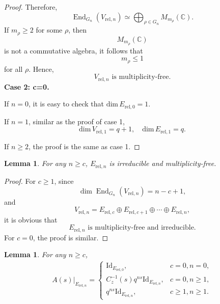 \documentclass[11pt]{amsart}
\newtheorem {lemma}      [theorem]    {Lemma}
\renewcommand{\rm}{\mathrm}
\theoremstyle{definition}
\numberwithin{equation}{section}
\begin{document}
\begin{proof}
		Therefore,
		\[
		\operatorname{End}_{G_n}(V_{\rm{rel},n}) \simeq \bigoplus_{\rho \in \widehat{G_n}} M_{m_\rho}(\mathbb{C}).
		\]
		If \(m_\rho \geq 2\) for some \(\rho\), then
		\[
		M_{m_\rho}(\mathbb{C})
		\]
		is not a commutative algebra, it follows that
		\[
		m_\rho \leq 1
		\]
		for all \(\rho\). Hence,
		\[
		V_{\rm{rel},n} \text{ is multiplicity-free.}
		\]
		\textbf{Case 2: c=0.}
		
		
		If \(n=0\), it is easy to check that \(\rm{dim}\,E_{\rm{rel},0}=1.\)
		
		
		If \(n=1\), similar as the proof of case 1, \[\rm{dim}\, V_{\rm{rel},1}=q+1,\quad \rm{dim}\,E_{\rm{rel},1}=q.\]
		
		
		If \(n\ge 2\), the proof is the same as case 1.
		
	\end{proof}
	\begin{lemma}\label{schur}
		For any \(n\ge c\), \(E_{\rm{rel},n}\) is irreducible and multiplicity-free.
	\end{lemma}
	\begin{proof}
		For \(c\ge1\), since 
		\[\dim \operatorname{End}_{G_n}(V_{\rm{rel},n}) = n - c + 1,\]and
		\[V_{\rm{rel},n}=E_{\rm{rel},c}\oplus E_{\rm{rel},c+1}\oplus\cdots\oplus E_{\rm{rel},n},\]it is obvious that \[E_{\rm{rel},n} \text{ is multiplicity-free and irreducible.}\]
		For \(c=0\), the proof is similar.
	\end{proof}
	\begin{lemma}
		For any \(n\ge c\), 
		\begin{align}\label{En}
			A(s)|_{E_{\rm{rel},n}}=\begin{cases}
				\rm{Id}_{E_{\rm{rel},0}},&c=0,n=0,\\
				C_z^{-1}(s)q^{ns}\rm{Id}_{E_{\rm{rel},n}},&c=0,n\ge1,\\
				q^{ns}\rm{Id}_{E_{\rm{rel},n}},&c\ge1,n\ge1.
			\end{cases}
		\end{align}
	\end{lemma}
\end{document}
